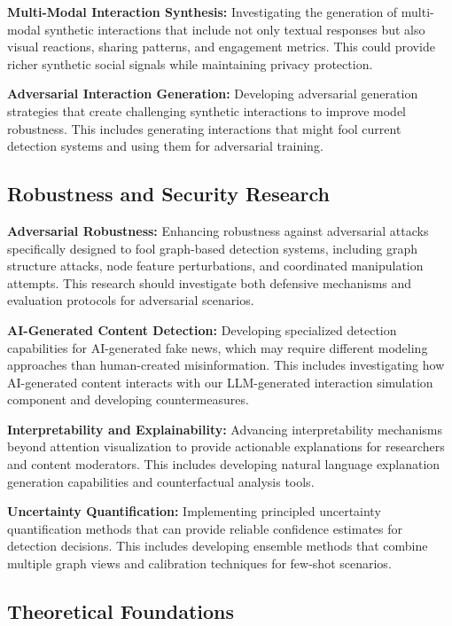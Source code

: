 \textbf{Multi-Modal Interaction Synthesis:} Investigating the generation of multi-modal synthetic interactions that include not only textual responses but also visual reactions, sharing patterns, and engagement metrics. This could provide richer synthetic social signals while maintaining privacy protection.

\textbf{Adversarial Interaction Generation:} Developing adversarial generation strategies that create challenging synthetic interactions to improve model robustness. This includes generating interactions that might fool current detection systems and using them for adversarial training.

\subsection{Robustness and Security Research}

\textbf{Adversarial Robustness:} Enhancing robustness against adversarial attacks specifically designed to fool graph-based detection systems, including graph structure attacks, node feature perturbations, and coordinated manipulation attempts. This research should investigate both defensive mechanisms and evaluation protocols for adversarial scenarios.

\textbf{AI-Generated Content Detection:} Developing specialized detection capabilities for AI-generated fake news, which may require different modeling approaches than human-created misinformation. This includes investigating how AI-generated content interacts with our LLM-generated interaction simulation component and developing countermeasures.

\textbf{Interpretability and Explainability:} Advancing interpretability mechanisms beyond attention visualization to provide actionable explanations for researchers and content moderators. This includes developing natural language explanation generation capabilities and counterfactual analysis tools.

\textbf{Uncertainty Quantification:} Implementing principled uncertainty quantification methods that can provide reliable confidence estimates for detection decisions. This includes developing ensemble methods that combine multiple graph views and calibration techniques for few-shot scenarios.

\subsection{Theoretical Foundations}

